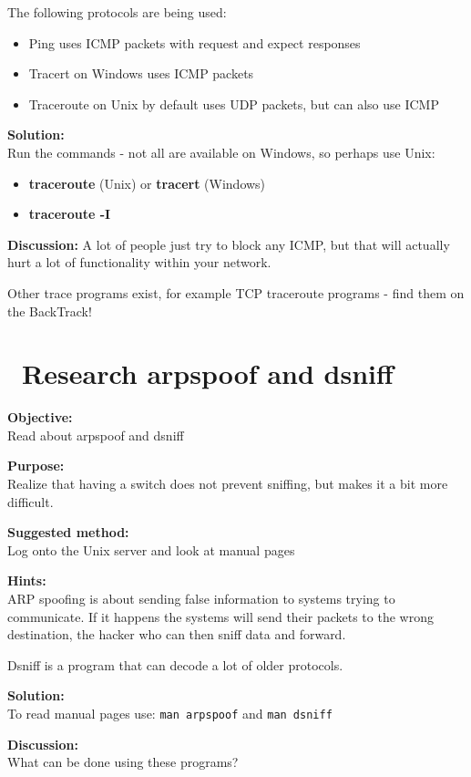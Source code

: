\documentclass[a4paper,11pt,notitlepage]{report}
\begin{document}
The following protocols are being used:
\begin{itemize}
\item Ping uses ICMP packets with request and expect responses
\item Tracert on Windows uses ICMP packets
\item Traceroute on Unix by default uses UDP packets, but can also use ICMP
\end{itemize}

{\bf Solution:}\\
Run the commands - not all are available on Windows, so perhaps use Unix:
\begin{itemize}
\item {\bf traceroute} (Unix) or {\bf tracert} (Windows)
\item {\bf traceroute -I}\\
\end{itemize}

{\bf Discussion:}
A lot of people just try to block any ICMP, but that will actually hurt a lot of functionality within your network.

Other trace programs exist, for example TCP traceroute programs - find them on the BackTrack!

\chapter{\faInfoCircle\ Research arpspoof and dsniff}
\label{ex:arpspoof}
{\bf Objective:} \\
Read about arpspoof and dsniff

{\bf Purpose:}\\
Realize that having a switch does not prevent sniffing, but makes it a bit more difficult.

{\bf Suggested method:} \\
Log onto the Unix server and look at manual pages

{\bf Hints:} \\
ARP spoofing is about sending false information to systems trying to communicate. If it happens the systems will send their packets to the wrong destination, the hacker who can then sniff data and forward.

Dsniff is a program that can decode a lot of older protocols.

{\bf Solution:}\\
To read manual pages use: \verb+man arpspoof+ and
\verb+man dsniff+


{\bf Discussion:}\\
What can be done using these programs?
\end{document}
